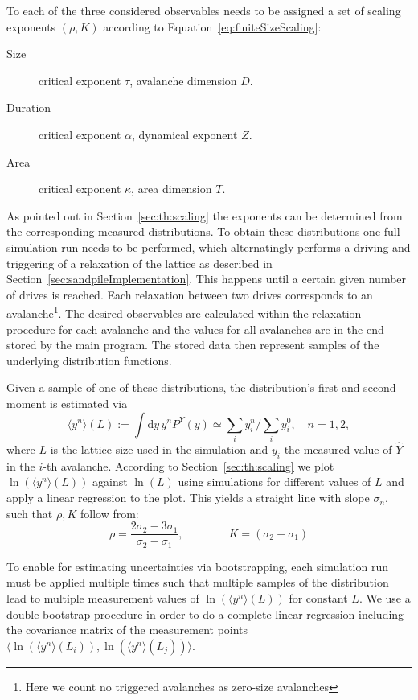 To each of the three considered observables needs to be assigned a set of scaling exponents $(\rho,K)$
according to Equation~\eqref{eq:finiteSizeScaling}:
\begin{description}
\item[Size] critical exponent $\tau$, avalanche dimension $D$.
\item[Duration] critical exponent $\alpha$, dynamical exponent $Z$.
\item[Area] critical exponent $\kappa$, area dimension $T$.
\end{description}

As pointed out in Section~\ref{sec:th:scaling} the exponents can be determined from the corresponding measured
distributions. To obtain these distributions one full simulation run needs to be performed, which alternatingly performs
a driving and triggering of a relaxation of the lattice as described in Section~\ref{sec:sandpileImplementation}.
This happens until a certain given number of drives is reached. Each relaxation between two drives corresponds to an
avalanche\footnote{Here we count no triggered avalanches as zero-size avalanches}. The desired observables are
calculated within the relaxation procedure for each avalanche and the values for all avalanches are in the end stored
by the main program. The stored data then represent samples of the underlying distribution functions.

Given a sample of one of these distributions, the distribution's first and second moment is estimated via
\begin{equation}
\langle y^n\rangle(L) := \int\!\mathrm{d}y\, y^n P^{Y}(y) \simeq \sum_i y_i^n \Big/ \sum_i y_i^0,\quad n=1,2,
\end{equation}
where $L$ is the lattice size used in the simulation and $y_i$ the measured value of $\hat{Y}$ in the $i$-th avalanche.
According to Section~\ref{sec:th:scaling} we plot $\ln\left(\langle y^n\rangle(L)\right)$ against $\ln\left(L\right)$
using simulations for different values of $L$ and apply a linear regression to the plot. This yields a straight line
with slope $\sigma_n$, such that $\rho, K$ follow from:
\begin{equation}
\rho = \frac{2\sigma_2 - 3\sigma_1}{\sigma_2 - \sigma_1}, \qquad\qquad K = (\sigma_2-\sigma_1)
\end{equation}

To enable for estimating uncertainties via bootstrapping, each simulation run must be applied multiple times such that
multiple samples of the distribution lead to multiple measurement values of $\ln\left(\langle y^n\rangle(L)\right)$
for constant $L$. We use a double bootstrap procedure in order to do a complete linear regression
including the covariance matrix of the measurement points
$\langle\ln\left(\langle y^n\rangle(L_i)\right), \ln\left(\langle y^n\rangle(L_j)\right)\rangle$.


